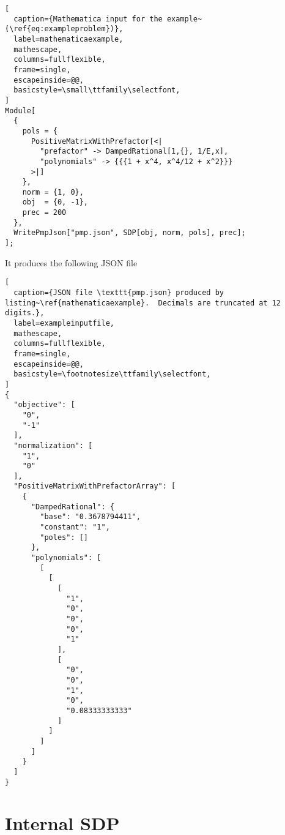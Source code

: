 \documentclass[12pt]{article}
\numberwithin{equation}{section}
\begin{document}
\begin{lstlisting}[
  caption={Mathematica input for the example~(\ref{eq:exampleproblem})},
  label=mathematicaexample,
  mathescape,
  columns=fullflexible,
  frame=single,
  escapeinside=@@,
  basicstyle=\small\ttfamily\selectfont,
]
Module[
  {
    pols = {
      PositiveMatrixWithPrefactor[<|
        "prefactor" -> DampedRational[1,{}, 1/E,x],
        "polynomials" -> {{{1 + x^4, x^4/12 + x^2}}}
      >|]
    },
    norm = {1, 0},
    obj  = {0, -1},
    prec = 200
  },
  WritePmpJson["pmp.json", SDP[obj, norm, pols], prec];
];
\end{lstlisting}
It produces the following JSON file
\begin{lstlisting}[
  caption={JSON file \texttt{pmp.json} produced by listing~\ref{mathematicaexample}.  Decimals are truncated at 12 digits.},
  label=exampleinputfile,
  mathescape,
  columns=fullflexible,
  frame=single,
  escapeinside=@@,
  basicstyle=\footnotesize\ttfamily\selectfont,
]
{
  "objective": [
    "0",
    "-1"
  ],
  "normalization": [
    "1",
    "0"
  ],
  "PositiveMatrixWithPrefactorArray": [
    {
      "DampedRational": {
        "base": "0.3678794411",
        "constant": "1",
        "poles": []
      },
      "polynomials": [
        [
          [
            [
              "1",
              "0",
              "0",
              "0",
              "1"
            ],
            [
              "0",
              "0",
              "1",
              "0",
              "0.08333333333"
            ]
          ]
        ]
      ]
    }
  ]
}
\end{lstlisting}

\section{Internal SDP}
\label{sec:translationPMPtoSDP}
\end{document}
